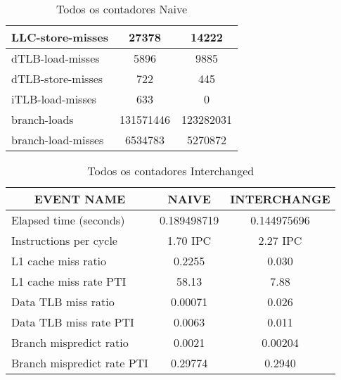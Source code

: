 \documentclass[11pt, oneside]{article}   	%
\begin{document}
\begin{table}[]
\begin{tabular}{|l|c|c|}
LLC-store-misses                          & 27378          & 14222                 \\ \hline
dTLB-load-misses                          & 5896           & 9885                  \\ \hline
dTLB-store-misses                         & 722            & 445                   \\ \hline
iTLB-load-misses                          & 633            & 0                     \\ \hline
branch-loads                              & 131571446      & 123282031             \\ \hline
branch-load-misses                        & 6534783        & 5270872               \\ \hline
\end{tabular}
\caption{Todos os contadores Naive}
\end{table}

\begin{table}[]
\centering
\label{my-label}
\begin{tabular}{|l|c|c|}
\hline
\multicolumn{1}{|c|}{\textbf{EVENT NAME}} & \textbf{NAIVE} & \textbf{INTERCHANGE} \\ \hline
Elapsed time (seconds)                    & 0.189498719    & 0.144975696          \\ \hline
Instructions per cycle                    & 1.70 IPC       & 2.27 IPC             \\ \hline
L1 cache miss ratio                       & 0.2255         & 0.030                \\ \hline
L1 cache miss rate PTI                    & 58.13          & 7.88                 \\ \hline
Data TLB miss ratio                       & 0.00071        & 0.026                \\ \hline
Data TLB miss rate PTI                    & 0.0063         & 0.011                \\ \hline
Branch mispredict ratio                   & 0.0021         & 0.00204              \\ \hline
Branch mispredict rate PTI                & 0.29774        & 0.2940               \\ \hline
\end{tabular}
\caption{Todos os contadores Interchanged}
\end{table}
\end{document}
